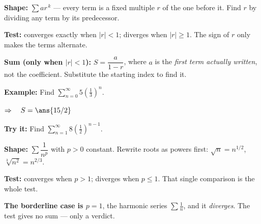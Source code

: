 \documentclass[12pt]{article}
\begin{document}


\begin{formulabox}
\textbf{Shape:} $\sum a r^{\,k}$ --- every term is a fixed multiple $r$ of the one before
it. Find $r$ by dividing any term by its predecessor.\par
\smallskip
\textbf{Test:} converges exactly when $|r| < 1$; diverges when $|r| \geq 1$. The sign of
$r$ only makes the terms alternate.\par
\smallskip
\textbf{Sum (only when $|r| < 1$):} $S = \dfrac{a}{1 - r}$, where $a$ is the
\emph{first term actually written}, not the coefficient. Substitute the starting index to
find it.
\end{formulabox}

\begin{examplebox}
\textbf{Example:} \quad Find $\displaystyle\sum_{n=0}^{\infty} 5\left(\tfrac{1}{3}\right)^{n}$.

$\Rightarrow\quad S = \ans{15/2}$
\end{examplebox}

\begin{tryitbox}
\textbf{Try it:} \quad Find $\displaystyle\sum_{n=1}^{\infty} 8\left(\tfrac{1}{2}\right)^{n-1}$.\\[2pt]
\end{tryitbox}


\begin{formulabox}
\textbf{Shape:} $\sum \dfrac{1}{n^{p}}$ with $p > 0$ constant. Rewrite roots as powers
first: $\sqrt{n} = n^{1/2}$, $\sqrt[3]{n^{2}} = n^{2/3}$.\par
\smallskip
\textbf{Test:} converges when $p > 1$; diverges when $p \leq 1$. That single comparison is
the whole test.\par
\smallskip
\textbf{The borderline case is $p = 1$}, the harmonic series $\sum \tfrac{1}{n}$, and it
\emph{diverges}. The test gives no sum --- only a verdict.
\end{formulabox}
\end{document}
